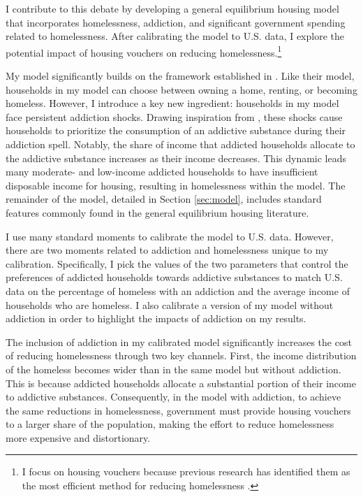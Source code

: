 \documentclass[parskip=full]{article}
\begin{document}
I contribute to this debate by developing a general equilibrium housing model that incorporates homelessness, addiction, and significant government spending related to homelessness. After calibrating the model to U.S. data, I explore the potential impact of housing vouchers on reducing homelessness.\footnote{I focus on housing vouchers because previous research has identified them as the most efficient method for reducing homelessness \citep{az-2024}.}

My model significantly builds on the framework established in \citet{az-2024}. Like their model, households in my model can choose between owning a home, renting, or becoming homeless. However, I introduce a key new ingredient: households in my model face persistent addiction shocks. Drawing inspiration from \citet{becker-stigler-1977}, these shocks cause households to prioritize the consumption of an addictive substance during their addiction spell. Notably, the share of income that addicted households allocate to the addictive substance increases as their income decreases. This dynamic leads many moderate- and low-income addicted households to have insufficient disposable income for housing, resulting in homelessness within the model. The remainder of the model, detailed in Section \ref{sec:model}, includes standard features commonly found in the general equilibrium housing literature.

I use many standard moments to calibrate the model to U.S. data. However, there are two moments related to addiction and homelessness unique to my calibration. Specifically, I pick the values of the two parameters that control the preferences of addicted households towards addictive substances to match U.S. data on the percentage of homeless with an addiction and the average income of households who are homeless. I also calibrate a version of my model without addiction in order to highlight the impacts of addiction on my results.

The inclusion of addiction in my calibrated model significantly increases the cost of reducing homelessness through two key channels. First, the income distribution of the homeless becomes wider than in the same model but without addiction. This is because addicted households allocate a substantial portion of their income to addictive substances. Consequently, in the model with addiction, to achieve the same reductions in homelessness, government must provide housing vouchers to a larger share of the population, making the effort to reduce homelessness more expensive and distortionary.
\end{document}

